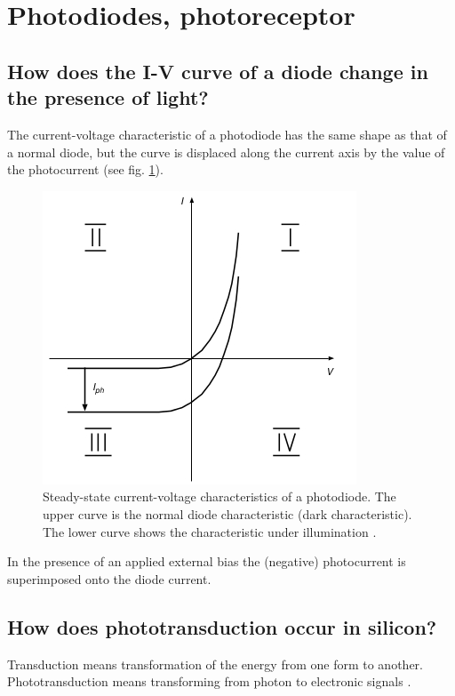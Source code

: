 \documentclass[report]{subfiles}
\begin{document}
\section{Photodiodes, photoreceptor}

\subsection{How does the I-V curve of a diode change in the presence of light?}

The current-voltage characteristic of a photodiode has the same
shape as that of a normal diode, but the curve is displaced along the current
axis by the value of the photocurrent (see fig. \ref{fig:photodiode_charac}).

\begin{figure}[htbp]
  \centering
  \includegraphics[scale=0.8]{pics/photodiode_charac.jpg}
  \caption{Steady-state current-voltage characteristics of a photodiode. The upper curve is the normal diode characteristic (dark characteristic). The lower curve shows the characteristic under illumination \cite{book:VLSI}.}
  \label{fig:photodiode_charac}
\end{figure} 

In the presence of an applied external bias the (negative) photocurrent  is superimposed onto the diode current.

\subsection{How does phototransduction occur in silicon?}

Transduction means transformation of the energy from one form to another. Phototransduction means transforming from photon to electronic signals \cite{lab8}.
\end{document}
